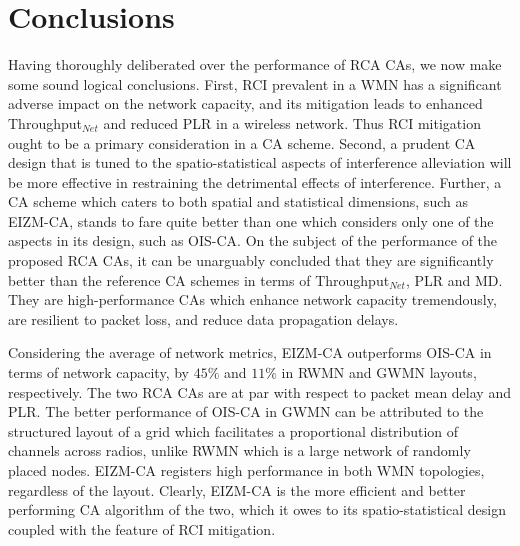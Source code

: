 \documentclass[conference]{IEEEtran}
\begin{document}
\section{Conclusions}
Having thoroughly deliberated over the performance of RCA CAs, we now make some sound logical conclusions. First, RCI prevalent in a WMN has a significant adverse impact on the network capacity, and its mitigation leads to enhanced Throughput$_{Net}$ and reduced PLR in a wireless network. Thus RCI mitigation ought to be a primary consideration in a CA scheme. Second, a prudent CA design that is tuned to the spatio-statistical aspects of interference alleviation will be more effective in restraining the detrimental effects of interference. Further, a CA scheme which caters to both spatial and statistical dimensions, such as EIZM-CA, stands to fare quite better than one which considers only one of the aspects in its design, such as OIS-CA. On the subject of the performance of the proposed RCA CAs, it can be unarguably concluded that they are significantly better than the reference CA schemes in terms of Throughput$_{Net}$, PLR and MD. They are high-performance CAs which enhance network capacity tremendously, 
are 
resilient to packet loss, and reduce data propagation delays. 

Considering the average of network metrics, EIZM-CA outperforms OIS-CA in terms of network capacity, by $45\%$ and $11\%$ in RWMN and GWMN layouts, respectively. The two RCA CAs are at par with respect to packet mean delay and PLR. The better performance of OIS-CA in GWMN can be attributed to the structured layout of a grid which facilitates a proportional distribution of channels across radios, unlike RWMN which is a large network of randomly placed nodes. EIZM-CA registers high performance in both WMN topologies, regardless of the layout. Clearly, EIZM-CA is the more efficient and better performing CA algorithm of the two, which it owes to its spatio-statistical design coupled with the feature of RCI mitigation.





\end{document}
